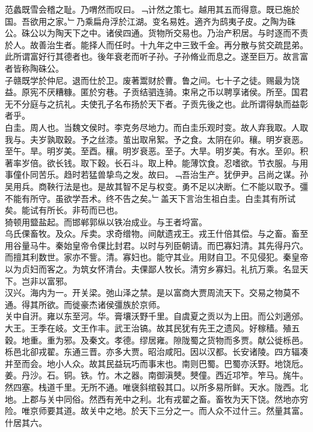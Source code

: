 \documentclass{zhvt-classic}
\begin{document}
\hspace*{2em}范蠡既雪会稽之耻。乃喟然而叹曰。﹁计然之策七。越用其五而得意。既已施於国。吾欲用之家。﹂乃乘扁舟浮於江湖。变名易姓。適齐为鸱夷子皮。之陶为硃公。硃公以为陶天下之中。诸侯四通。货物所交易也。乃治产积居。与时逐而不责於人。故善治生者。能择人而任时。十九年之中三致千金。再分散与贫交疏昆弟。此所谓富好行其德者也。後年衰老而听子孙。子孙脩业而息之。遂至巨万。故言富者皆称陶硃公。\\
\hspace*{2em}子赣既学於仲尼。退而仕於卫。废著鬻财於曹。鲁之间。七十子之徒。赐最为饶益。原宪不厌糟糠。匿於穷巷。子贡结驷连骑。束帛之币以聘享诸侯。所至。国君无不分庭与之抗礼。夫使孔子名布扬於天下者。子贡先後之也。此所谓得埶而益彰者乎。\\
\hspace*{2em}白圭。周人也。当魏文侯时。李克务尽地力。而白圭乐观时变。故人弃我取。人取我与。夫岁孰取穀。予之丝漆。茧出取帛絮。予之食。太阴在卯。穰。明岁衰恶。至午。旱。明岁美。至酉。穰。明岁衰恶。至子。大旱。明岁美。有水。至卯。积著率岁倍。欲长钱。取下穀。长石斗。取上种。能薄饮食。忍嗜欲。节衣服。与用事僮仆同苦乐。趋时若猛兽挚鸟之发。故曰。﹁吾治生产。犹伊尹。吕尚之谋。孙吴用兵。商鞅行法是也。是故其智不足与权变。勇不足以决断。仁不能以取予。彊不能有所守。虽欲学吾术。终不告之矣。﹂盖天下言治生祖白圭。白圭其有所试矣。能试有所长。非苟而已也。\\
\hspace*{2em}猗顿用盬盐起。而邯郸郭纵以铁冶成业。与王者埒富。\\
\hspace*{2em}乌氏倮畜牧。及众。斥卖。求奇缯物。间献遗戎王。戎王什倍其偿。与之畜。畜至用谷量马牛。秦始皇帝令倮比封君。以时与列臣朝请。而巴寡妇清。其先得丹穴。而擅其利数世。家亦不訾。清。寡妇也。能守其业。用财自卫。不见侵犯。秦皇帝以为贞妇而客之。为筑女怀清台。夫倮鄙人牧长。清穷乡寡妇。礼抗万乘。名显天下。岂非以富邪。\\
\hspace*{2em}汉兴。海内为一。开关梁。弛山泽之禁。是以富商大贾周流天下。交易之物莫不通。得其所欲。而徙豪杰诸侯彊族於京师。\\
\hspace*{2em}关中自汧。雍以东至河。华。膏壤沃野千里。自虞夏之贡以为上田。而公刘適邠。大王。王季在岐。文王作丰。武王治镐。故其民犹有先王之遗风。好稼穑。殖五穀。地重。重为邪。及秦文。孝德。缪居雍。隙陇蜀之货物而多贾。献公徙栎邑。栎邑北卻戎翟。东通三晋。亦多大贾。昭治咸阳。因以汉都。长安诸陵。四方辐凑并至而会。地小人众。故其民益玩巧而事末也。南则巴蜀。巴蜀亦沃野。地饶卮。姜。丹沙。石。铜。铁。竹。木之器。南御滇僰。僰僮。西近邛笮。笮马。旄牛。然四塞。栈道千里。无所不通。唯襃斜绾毂其口。以所多易所鲜。天水。陇西。北地。上郡与关中同俗。然西有羌中之利。北有戎翟之畜。畜牧为天下饶。然地亦穷险。唯京师要其道。故关中之地。於天下三分之一。而人众不过什三。然量其富。什居其六。\\
\end{document}
